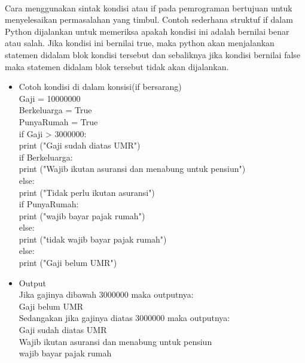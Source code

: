 \documentclass{article}
\begin{document}
        \paragraph{}Cara menggunakan sintak kondisi atau if pada pemrograman bertujuan untuk menyelesaikan permasalahan yang timbul. Contoh sederhana struktuf if dalam Python dijalankan untuk memeriksa apakah kondisi ini adalah bernilai benar atau salah. Jika kondisi ini bernilai true, maka python akan menjalankan statemen didalam blok kondisi tersebut dan sebaliknya jika kondisi bernilai false maka statemen didalam blok tersebut tidak akan dijalankan.
            \begin{itemize}
                \item Cotoh kondisi di dalam konsisi(if bersarang)\\    
                    Gaji = 10000000\\
                    Berkeluarga = True\\
                    PunyaRumah = True\\
                    
                    if Gaji > 3000000:\\
                        print ("Gaji sudah diatas UMR")\\
                        if Berkeluarga:\\
                            print ("Wajib ikutan asuransi dan menabung untuk pensiun")\\
                        else:\\
                            print ("Tidak perlu ikutan asuransi")\\
                    
                        if PunyaRumah:\\
                            print ("wajib bayar pajak rumah")\\
                        else:\\
                            print ("tidak wajib bayar pajak rumah")\\
                    else:\\
                        print ("Gaji belum UMR")\\
                \item Output\\
                    Jika gajinya dibawah 3000000 maka outputnya:\\
                    Gaji belum UMR\\
                    
                    Sedangakan jika gajinya diatas 3000000 maka outputnya:\\
                    Gaji sudah diatas UMR\\
                    Wajib ikutan asuransi dan menabung untuk pensiun\\
                    wajib bayar pajak rumah\\
            \end{itemize}
        
\end{document}
